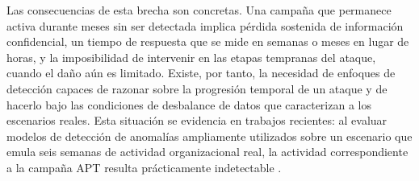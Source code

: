 Las consecuencias de esta brecha son concretas. Una campaña que permanece activa durante meses sin ser detectada implica pérdida sostenida de información confidencial, un tiempo de respuesta que se mide en semanas o meses en lugar de horas, y la imposibilidad de intervenir en las etapas tempranas del ataque, cuando el daño aún es limitado. Existe, por tanto, la necesidad de enfoques de detección capaces de razonar sobre la progresión temporal de un ataque y de hacerlo bajo las condiciones de desbalance de datos que caracterizan a los escenarios reales. Esta situación se evidencia en trabajos recientes: al evaluar modelos de detección de anomalías ampliamente utilizados sobre un escenario que emula seis semanas de actividad organizacional real, la actividad correspondiente a la campaña APT resulta prácticamente indetectable \parencite{myneni2023unraveled}.